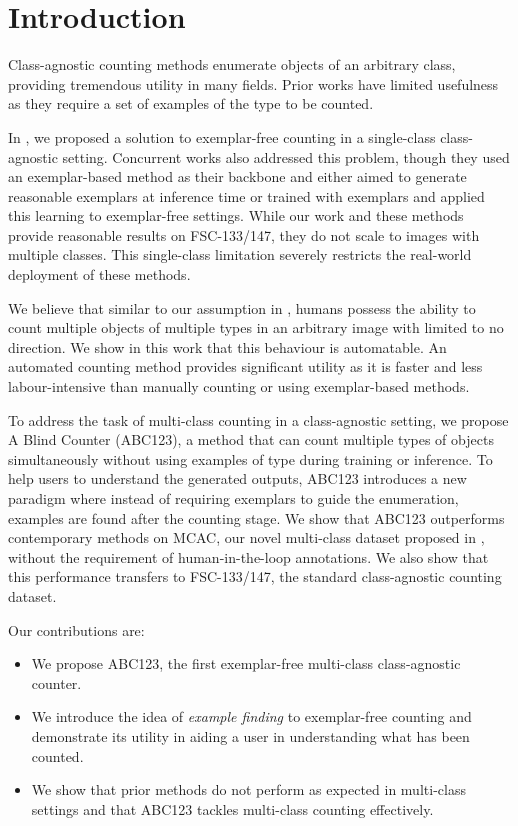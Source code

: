\documentclass[../thesis.tex]{subfiles}
\begin{document}
\section{Introduction}
\label{Introduction}
Class-agnostic counting methods enumerate objects of an arbitrary class, providing tremendous utility in many fields.
Prior works have limited usefulness as they require a set of examples of the type to be counted.


In , we proposed a solution to exemplar-free counting in a single-class class-agnostic setting. Concurrent works \cite{ranjan2022exemplar, liu2022countr} also addressed this problem, though they used an exemplar-based method as their backbone and either aimed to generate reasonable exemplars at inference time or trained with exemplars and applied this learning to exemplar-free settings. 
While our work and these methods provide reasonable results on FSC-133/147, they do not scale to images with multiple classes.
This single-class limitation severely restricts the real-world deployment of these methods.

We believe that similar to our assumption in , humans possess the ability to count multiple objects of multiple types in an arbitrary image with limited to no direction.
We show in this work that this behaviour is automatable. An automated counting method provides significant utility as it is faster and less labour-intensive than manually counting or using exemplar-based methods.

To address the task of multi-class counting in a class-agnostic setting, we propose A Blind Counter (ABC123), a method that can count multiple types of objects simultaneously without using examples of type during training or inference.
To help users to understand the generated outputs, ABC123 introduces a new paradigm where instead of requiring exemplars to guide the enumeration, examples are found after the counting stage.
We show that ABC123 outperforms contemporary methods on MCAC, our novel multi-class dataset proposed in , without the requirement of human-in-the-loop annotations. We also show that this performance transfers to FSC-133/147, the standard class-agnostic counting dataset.

\noindent Our contributions are:
\begin{itemize}
    \item  We propose ABC123, the first exemplar-free multi-class class-agnostic counter.
    \item We introduce the idea of \textit{example finding} to exemplar-free counting and demonstrate its utility in aiding a user in understanding what has been counted.
    \item We show that prior methods do not perform as expected in multi-class settings and that ABC123 tackles multi-class counting effectively.
\end{itemize}
\end{document}
